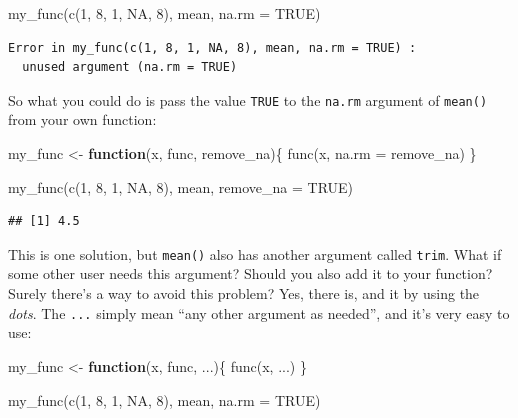 \documentclass[
]{article}
\newenvironment{Shaded}{\begin{snugshade}}{\end{snugshade}}
\newcommand{\AttributeTok}[1]{\textcolor[rgb]{0.77,0.63,0.00}{#1}}
\newcommand{\ConstantTok}[1]{\textcolor[rgb]{0.00,0.00,0.00}{#1}}
\newcommand{\ControlFlowTok}[1]{\textcolor[rgb]{0.13,0.29,0.53}{\textbf{#1}}}
\newcommand{\DecValTok}[1]{\textcolor[rgb]{0.00,0.00,0.81}{#1}}
\newcommand{\FunctionTok}[1]{\textcolor[rgb]{0.00,0.00,0.00}{#1}}
\newcommand{\NormalTok}[1]{#1}
\newcommand{\OtherTok}[1]{\textcolor[rgb]{0.56,0.35,0.01}{#1}}
\begin{document}
\begin{Shaded}
\begin{Highlighting}[]
\FunctionTok{my\_func}\NormalTok{(}\FunctionTok{c}\NormalTok{(}\DecValTok{1}\NormalTok{, }\DecValTok{8}\NormalTok{, }\DecValTok{1}\NormalTok{, }\ConstantTok{NA}\NormalTok{, }\DecValTok{8}\NormalTok{), mean, }\AttributeTok{na.rm =} \ConstantTok{TRUE}\NormalTok{)}
\end{Highlighting}
\end{Shaded}

\begin{verbatim}
Error in my_func(c(1, 8, 1, NA, 8), mean, na.rm = TRUE) :
  unused argument (na.rm = TRUE)
\end{verbatim}

So what you could do is pass the value \texttt{TRUE} to the \texttt{na.rm} argument of \texttt{mean()} from your own
function:

\begin{Shaded}
\begin{Highlighting}[]
\NormalTok{my\_func }\OtherTok{\textless{}{-}} \ControlFlowTok{function}\NormalTok{(x, func, remove\_na)\{}
  \FunctionTok{func}\NormalTok{(x, }\AttributeTok{na.rm =}\NormalTok{ remove\_na)}
\NormalTok{\}}

\FunctionTok{my\_func}\NormalTok{(}\FunctionTok{c}\NormalTok{(}\DecValTok{1}\NormalTok{, }\DecValTok{8}\NormalTok{, }\DecValTok{1}\NormalTok{, }\ConstantTok{NA}\NormalTok{, }\DecValTok{8}\NormalTok{), mean, }\AttributeTok{remove\_na =} \ConstantTok{TRUE}\NormalTok{)}
\end{Highlighting}
\end{Shaded}

\begin{verbatim}
## [1] 4.5
\end{verbatim}

This is one solution, but \texttt{mean()} also has another argument called \texttt{trim}. What if some other
user needs this argument? Should you also add it to your function? Surely there's a way to avoid
this problem? Yes, there is, and it by using the \emph{dots}. The \texttt{...} simply mean ``any other
argument as needed'', and it's very easy to use:

\begin{Shaded}
\begin{Highlighting}[]
\NormalTok{my\_func }\OtherTok{\textless{}{-}} \ControlFlowTok{function}\NormalTok{(x, func, ...)\{}
  \FunctionTok{func}\NormalTok{(x, ...)}
\NormalTok{\}}

\FunctionTok{my\_func}\NormalTok{(}\FunctionTok{c}\NormalTok{(}\DecValTok{1}\NormalTok{, }\DecValTok{8}\NormalTok{, }\DecValTok{1}\NormalTok{, }\ConstantTok{NA}\NormalTok{, }\DecValTok{8}\NormalTok{), mean, }\AttributeTok{na.rm =} \ConstantTok{TRUE}\NormalTok{)}
\end{Highlighting}
\end{Shaded}
\end{document}
